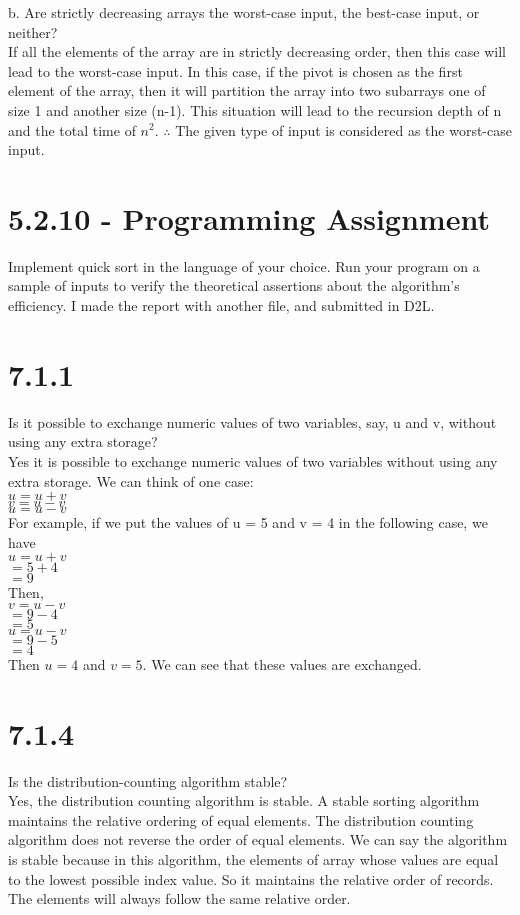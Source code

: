 \documentclass[8pt, letterpaper]{article}
\begin{document}
b. Are strictly decreasing arrays the worst-case input, the best-case input, or
neither? \\
If all the elements of the array are in strictly decreasing order, then this case will lead to the worst-case input. In this case, if the pivot is chosen as the first element of the array, then it will partition the array into two subarrays one of size 1 and another size (n-1). This situation will lead to the recursion depth of n and the total time of $n^2$. $\therefore$ The given type of input is considered as the worst-case input.

\section{5.2.10 - Programming Assignment}
Implement quick sort in the language of your choice. Run your program on a sample of inputs to verify the theoretical assertions about the algorithm’s efficiency.
\indent I made the report with another file, and submitted in D2L.

\section{7.1.1}
Is it possible to exchange numeric values of two variables, say, u and v, without using any extra storage? \\
Yes it is possible to exchange numeric values of two variables without using any extra storage. 
We can think of one case: \\
$u = u + v$ \\
$v = u - v$ \\
$u = u - v$ \\
For example, if we put the values of u = 5 and v = 4 in the following case, we have \\
$u = u + v$ \\
\indent $= 5 + 4$ \\
\indent $= 9$ \\
Then, \\
$v = u - v$ \\
\indent $= 9 - 4$ \\
\indent $ = 5$ \\
$u = u - v$ \\
\indent $= 9 - 5$ \\
\indent $= 4$ \\ 
Then $u = 4$ and $v = 5$. We can see that these values are exchanged.

\section{7.1.4}
Is the distribution-counting algorithm stable? \\
Yes, the distribution counting algorithm is stable. A stable sorting algorithm maintains the relative ordering of equal elements. The distribution counting algorithm does not reverse the order of equal elements. We can say the algorithm is stable because in this algorithm, the elements of array whose values are equal to the lowest possible index value. So it maintains the relative order of records. The elements will always follow the same relative order.
\end{document}
